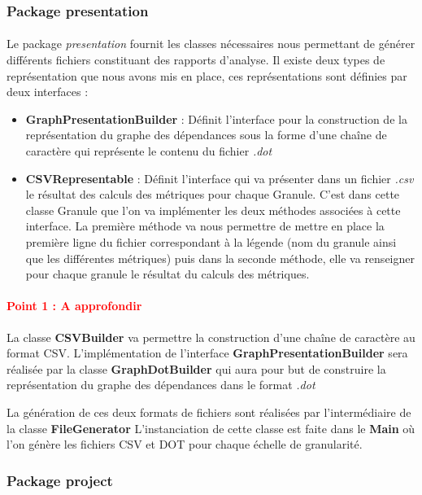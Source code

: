 \documentclass{scrartcl}
\newcommand{\TODO}[1] {
    \noindent \paragraph{\textcolor{red}{#1}}
}
\begin{document}
\subsubsection{Package presentation}
    \paragraph{}Le package \emph{presentation} fournit les classes nécessaires nous permettant de générer différents fichiers constituant des rapports d'analyse. Il existe deux types de représentation que nous avons mis en place, ces représentations sont définies par deux interfaces :
    \begin{itemize}
        \item \textbf{GraphPresentationBuilder} : Définit l'interface pour la construction de la représentation du graphe des dépendances sous la forme d'une chaîne de caractère qui représente le contenu du fichier \emph{.dot}
        \item \textbf{CSVRepresentable} : Définit l'interface qui va présenter dans un fichier \emph{.csv} le résultat des calculs des métriques pour chaque Granule. C'est dans cette classe Granule que l'on va implémenter les deux méthodes associées à cette interface. La première méthode va nous permettre de mettre en place la première ligne du fichier correspondant à la légende (nom du granule ainsi que les différentes métriques) puis dans la seconde méthode, elle va renseigner pour chaque granule le résultat du calculs des métriques. 
    \end{itemize}
    
     \TODO{Point 1 : A approfondir}
    
    La classe \textbf{CSVBuilder} va permettre la construction d'une chaîne de caractère au format CSV.
    L'implémentation de l'interface \textbf{GraphPresentationBuilder} sera réalisée par la classe \textbf{GraphDotBuilder} qui aura pour but de construire la représentation du graphe des dépendances dans le format \emph{.dot}
    
   La génération de ces deux formats de fichiers sont réalisées par l'intermédiaire de la classe \textbf{FileGenerator} 
   L'instanciation de cette classe est faite dans le \textbf{Main} où l'on génère les fichiers CSV et DOT pour chaque échelle de granularité.

    
\subsubsection{Package project}
\end{document}
